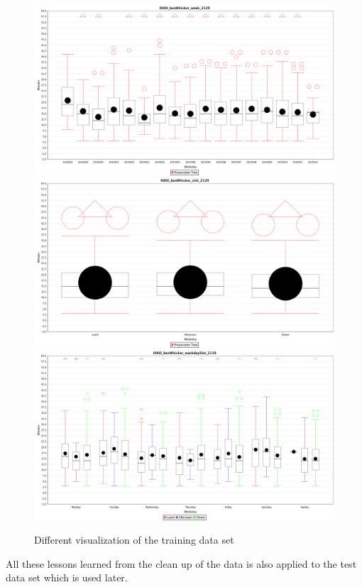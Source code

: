 \begin{figure}[htp]

\centering
\includegraphics[width=.3\textwidth]{images/0000_boxWhisker_week_2129.png}\hfill
\includegraphics[width=.3\textwidth]{images/0000_boxWhisker_slot_2129.png}\hfill
\includegraphics[width=.3\textwidth]{images/0000_boxWhisker_weekdaySlot_2129.png}

\caption{Different visualization of the training data set}
\label{fig:triple_boxWhisker}

\end{figure}

All these lessons learned from the clean up of the data is also applied to the test data set which is used later.

